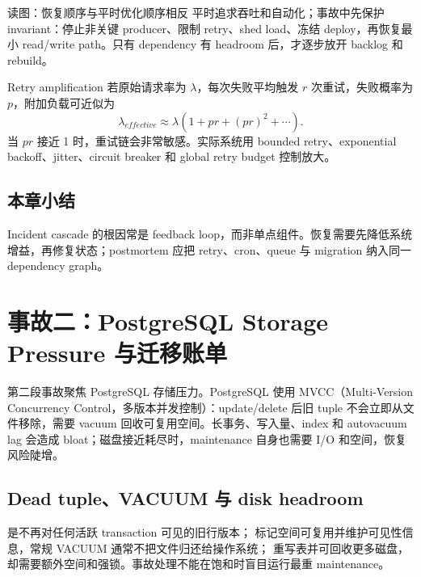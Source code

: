 \documentclass[a4paper]{article}
\begin{document}
\begin{knowledgebox}{读图：恢复顺序与平时优化顺序相反}
平时追求吞吐和自动化；事故中先保护 invariant：停止非关键 producer、限制 retry、shed load、冻结 deploy，再恢复最小 read/write path。只有 dependency 有 headroom 后，才逐步放开 backlog 和 rebuild。
\end{knowledgebox}

\begin{importantbox}{Retry amplification}
若原始请求率为 $\lambda$，每次失败平均触发 $r$ 次重试，失败概率为 $p$，附加负载可近似为
\[
\lambda_{effective}\approx \lambda(1+pr+(pr)^2+\cdots).
\]
当 $pr$ 接近 1 时，重试链会非常敏感。实际系统用 bounded retry、exponential backoff、jitter、circuit breaker 和 global retry budget 控制放大。
\end{importantbox}


\subsection{本章小结}

Incident cascade 的根因常是 feedback loop，而非单点组件。恢复需要先降低系统增益，再修复状态；postmortem 应把 retry、cron、queue 与 migration 纳入同一 dependency graph。

\section{事故二：PostgreSQL Storage Pressure 与迁移账单}

第二段事故聚焦 PostgreSQL 存储压力。PostgreSQL 使用 MVCC（Multi-Version Concurrency Control，多版本并发控制）：update/delete 后旧 tuple 不会立即从文件移除，需要 vacuum 回收可复用空间。长事务、写入量、index 和 autovacuum lag 会造成 bloat；磁盘接近耗尽时，maintenance 自身也需要 I/O 和空间，恢复风险陡增。

\subsection{Dead tuple、VACUUM 与 disk headroom}

 是不再对任何活跃 transaction 可见的旧行版本； 标记空间可复用并维护可见性信息，常规 VACUUM 通常不把文件归还给操作系统； 重写表并可回收更多磁盘，却需要额外空间和强锁。事故处理不能在饱和时盲目运行最重 maintenance。
\end{document}

